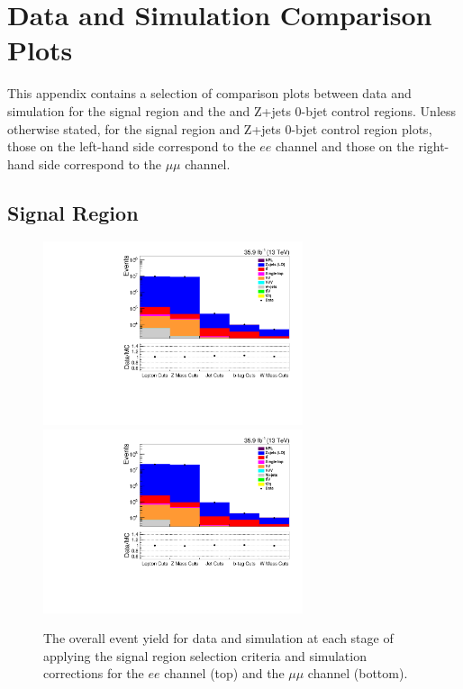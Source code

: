 \chapter{Data and Simulation Comparison Plots}\label{app:plots}
This appendix contains a selection of comparison plots between data and simulation for the signal region and the \ttbar and Z+jets 0-bjet control regions.
Unless otherwise stated, for the signal region and Z+jets 0-bjet control region plots, those on the left-hand side correspond to the $ee$ channel and those on the right-hand side correspond to the $\mu\mu$ channel.

\clearpage
\newpage

\section{Signal Region}\label{appSec:signalRegionPlots}
\begin{figure}[ht]
\centering
\includegraphics[width=0.68\textwidth]{figs/background-estimation/plots/unblinded/prompt_ee_ttbarInc/cutFlow_log.pdf}
\\
\includegraphics[width=0.68\textwidth]{figs/background-estimation/plots/unblinded/prompt_mumu_ttbarInc/cutFlow_log.pdf}
\caption{
The overall event yield for data and simulation at each stage of applying the signal region selection criteria and simulation corrections for the $ee$ channel (top) and the $\mu\mu$ channel (bottom).
}
\label{fig:App_SR_cutFlow}
\end{figure}


